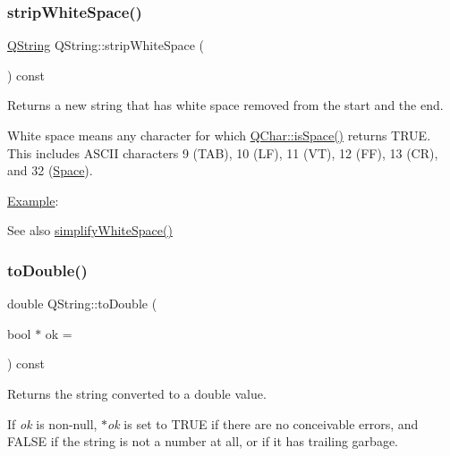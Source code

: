 \subsubsection{\texorpdfstring{stripWhiteSpace()}{stripWhiteSpace()}}
{\footnotesize\ttfamily \mbox{\hyperlink{class_q_string}{Q\+String}} Q\+String\+::strip\+White\+Space (\begin{DoxyParamCaption}{ }\end{DoxyParamCaption}) const}

Returns a new string that has white space removed from the start and the end.

White space means any character for which \mbox{\hyperlink{class_q_char_a67814eae107b451db9def198ae57aa8a}{Q\+Char\+::is\+Space()}} returns T\+R\+UE. This includes A\+S\+C\+II characters 9 (T\+AB), 10 (LF), 11 (VT), 12 (FF), 13 (CR), and 32 (\mbox{\hyperlink{class_space}{Space}}).

\mbox{\hyperlink{struct_example}{Example}}\+: 
\begin{DoxyCode}{0}
\end{DoxyCode}


\begin{DoxySeeAlso}{See also}
\mbox{\hyperlink{class_q_string_ad8e481726eb5a5f368eb1bb23c875847}{simplify\+White\+Space()}} 
\end{DoxySeeAlso}
\mbox{\label{class_q_string_aab75ed74d8b5db046acbe9562e3ae1ec}} 
\subsubsection{\texorpdfstring{toDouble()}{toDouble()}}
{\footnotesize\ttfamily double Q\+String\+::to\+Double (\begin{DoxyParamCaption}\item[{bool $\ast$}]{ok = {} }\end{DoxyParamCaption}) const}

Returns the string converted to a {\ttfamily double} value.

If {\itshape ok} is non-\/null, {\itshape $\ast$ok} is set to T\+R\+UE if there are no conceivable errors, and F\+A\+L\+SE if the string is not a number at all, or if it has trailing garbage. \mbox{\label{class_q_string_a42b5e7fb62765d02dae680c179e402e8}} 
